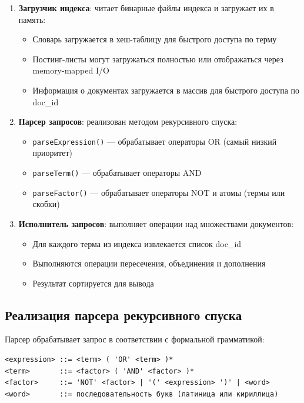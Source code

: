 \documentclass[a4paper,12pt]{article}
\begin{document}
\begin{enumerate}
    \item \textbf{Загрузчик индекса}: читает бинарные файлы индекса и загружает их в память:
    \begin{itemize}
        \item Словарь загружается в хеш-таблицу для быстрого доступа по терму
        \item Постинг-листы могут загружаться полностью или отображаться через memory-mapped I/O
        \item Информация о документах загружается в массив для быстрого доступа по doc\_id
    \end{itemize}

    \item \textbf{Парсер запросов}: реализован методом рекурсивного спуска:
    \begin{itemize}
        \item \texttt{parseExpression()} — обрабатывает операторы OR (самый низкий приоритет)
        \item \texttt{parseTerm()} — обрабатывает операторы AND
        \item \texttt{parseFactor()} — обрабатывает операторы NOT и атомы (термы или скобки)
    \end{itemize}

    \item \textbf{Исполнитель запросов}: выполняет операции над множествами документов:
    \begin{itemize}
        \item Для каждого терма из индекса извлекается список doc\_id
        \item Выполняются операции пересечения, объединения и дополнения
        \item Результат сортируется для вывода
    \end{itemize}
\end{enumerate}

\subsection{Реализация парсера рекурсивного спуска}

Парсер обрабатывает запрос в соответствии с формальной грамматикой:

\begin{verbatim}
<expression> ::= <term> ( 'OR' <term> )*
<term>       ::= <factor> ( 'AND' <factor> )*
<factor>     ::= 'NOT' <factor> | '(' <expression> ')' | <word>
<word>       ::= последовательность букв (латиница или кириллица)
\end{verbatim}
\end{document}
